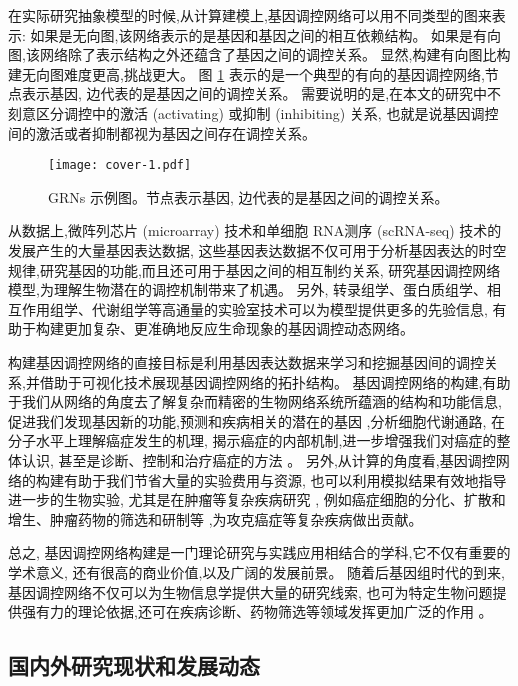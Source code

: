 在实际研究抽象模型的时候,从计算建模上,基因调控网络可以用不同类型的图来表示:
如果是无向图,该网络表示的是基因和基因之间的相互依赖结构。
如果是有向图,该网络除了表示结构之外还蕴含了基因之间的调控关系。
显然,构建有向图比构建无向图难度更高,挑战更大。
图 \ref{cover-1} 表示的是一个典型的有向的基因调控网络,节点表示基因, 边代表的是基因之间的调控关系。
需要说明的是,在本文的研究中不刻意区分调控中的激活 (activating) 或抑制 (inhibiting) 关系,
也就是说基因调控间的激活或者抑制都视为基因之间存在调控关系。
\begin{figure}[!htbp]
    \centering
    \texttt{[image: cover-1.pdf]}
    \caption{GRNs 示例图。节点表示基因, 边代表的是基因之间的调控关系。}
    \label{cover-1}
\end{figure}

从数据上,微阵列芯片 (microarray) 技术和单细胞 RNA测序 (scRNA-seq) 技术的发展产生的大量基因表达数据,
这些基因表达数据不仅可用于分析基因表达的时空规律,研究基因的功能,而且还可用于基因之间的相互制约关系,
研究基因调控网络模型,为理解生物潜在的调控机制带来了机遇。
另外, 转录组学、蛋白质组学、相互作用组学、代谢组学等高通量的实验室技术可以为模型提供更多的先验信息,
有助于构建更加复杂、更准确地反应生命现象的基因调控动态网络。

构建基因调控网络的直接目标是利用基因表达数据来学习和挖掘基因间的调控关系,并借助于可视化技术展现基因调控网络的拓扑结构。
基因调控网络的构建,有助于我们从网络的角度去了解复杂而精密的生物网络系统所蕴涵的结构和功能信息,
促进我们发现基因新的功能,预测和疾病相关的潜在的基因 ,分析细胞代谢通路,
在分子水平上理解癌症发生的机理,
揭示癌症的内部机制,进一步增强我们对癌症的整体认识,
甚至是诊断、控制和治疗癌症的方法 。
另外,从计算的角度看,基因调控网络的构建有助于我们节省大量的实验费用与资源,
也可以利用模拟结果有效地指导进一步的生物实验,
尤其是在肿瘤等复杂疾病研究 ,
例如癌症细胞的分化、扩散和增生、肿瘤药物的筛选和研制等 ,为攻克癌症等复杂疾病做出贡献。

总之, 基因调控网络构建是一门理论研究与实践应用相结合的学科,它不仅有重要的学术意义,
还有很高的商业价值,以及广阔的发展前景。
随着后基因组时代的到来,基因调控网络不仅可以为生物信息学提供大量的研究线索,
也可为特定生物问题提供强有力的理论依据,还可在疾病诊断、药物筛选等领域发挥更加广泛的作用 。

\subsection{国内外研究现状和发展动态}

